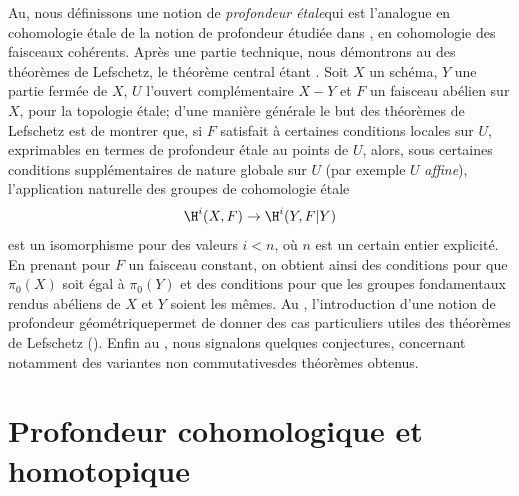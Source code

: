 \vspace*{1cm}
Au\pageoriginale \numero {}, nous d\'efinissons une notion de \og \textit{profondeur \'etale}\fg qui est l'analogue en cohomologie \'etale de la notion de profondeur \'etudi\'ee dans , en cohomologie des faisceaux coh\'erents. Apr\`es une partie technique, nous d\'emontrons au \numero {} des \og th\'eor\`emes de Lefschetz\fg, le th\'eor\`eme central \'etant . Soit $X$ un sch\'ema, $Y$ une partie ferm\'ee de $X$, $U$ l'ouvert compl\'ementaire $X-Y$ et $F$ un faisceau ab\'elien sur $X$, pour la topologie \'etale; d'une mani\`ere g\'en\'erale le but des th\'eor\`emes de Lefschetz est de montrer que, si $F$ satisfait \`a certaines conditions locales sur $U$, exprimables en termes de profondeur \'etale au points de $U$, alors, sous certaines conditions suppl\'ementaires de nature globale sur $U$ (par exemple $U$ \textit{affine}), l'application naturelle des groupes de cohomologie \'etale
$$
\H^i(X, F)\to \H^i(Y, F{|Y})$$
est un isomorphisme pour des valeurs $i<n$, o\`u $n$ est un certain entier explicit\'e. En prenant pour $F$ un faisceau constant, on obtient ainsi des conditions pour que $\pi_0(X)$ soit \'egal \`a $\pi_0(Y)$ et des conditions pour que les groupes fondamentaux rendus ab\'eliens de $X$ et $Y$ soient les m\^emes. Au \numero {}, l'introduction d'une notion de \og profondeur g\'eom\'etrique\fg permet de donner des cas particuliers utiles des th\'eor\`emes de Lefschetz (). Enfin au \numero {}, nous signalons quelques conjectures, concernant notamment des variantes \og non commutatives\fg des th\'eor\`emes obtenus.

\section{Profondeur cohomologique et homotopique}\label{XIV.1}

\setcounter{subsection}{-1}

